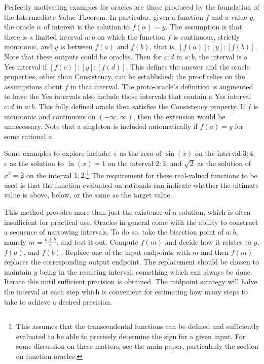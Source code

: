 \documentclass[12pt]{article}
\theoremstyle{remark}
\begin{document}
Perfectly motivating examples for oracles are those produced by the foundation of the Intermediate Value Theorem. In particular, given a function $f$ and a value $y$, the oracle $\alpha$ of interest is the solution to $f(\alpha) = y$. The assumption is that there is a limited interval $a:b$ on which the function $f$ is continuous, strictly monotonic, and $y$ is between $f(a)$ and $f(b)$, that is, $[f(a)] : [y] : [f(b)]$. Note that these outputs could be oracles. Then for $c:d$ in $a:b$, the interval is a Yes interval if $[f(c)]: [y] : [f(d)]$. This defines the answer and the oracle properties, other than Consistency, can be established; the proof relies on the assumptions about $f$ in that interval. The proto-oracle's definition is augmented to have the Yes intervals also include those intervals that contain a Yes interval $c:d$ in $a:b$. This fully defined oracle then satisfies the Consistency property. If $f$ is monotonic and continuous on $(-\infty, \infty)$, then the extension would be unnecessary. Note that a singleton is included automatically if $f(a) =y $ for some rational $a$.

Some examples to explore include: $\pi$ as the zero of $\sin(x)$ on the interval $3:4$, $e$ as the solution to  $\ln(x)=1$ on the interval $2:3$, and $\sqrt{2}$ as the solution of $x^2 = 2$ on the interval $1:2$.\footnote{This assumes that the transcendental functions can be defined and sufficiently evaluated to be able to precisely determine the sign for a given input. For some discussion on these matters, see the main paper, particularly the section on function oracles.} The requirement for these real-valued functions to be used is that the function evaluated on rationals can indicate whether the ultimate value is above, below, or the same as the target value. 

This method provides more than just the existence of a solution, which is often insufficient for practical use. Oracles in general come with the ability to construct a sequence of narrowing intervals. To do so, take the bisection point of $a:b$, namely $m =\frac{a+b}{2}$, and test it out. Compute $f(m)$ and decide how it relates to $y$, $f(a)$, and $f(b)$. Replace one of the input endpoints with $m$ and then $f(m)$ replaces the corresponding output endpoint. The replacement should be chosen to maintain $y$ being in the resulting interval, something which can always be done. Iterate this until sufficient precision is obtained.  The midpoint strategy will halve the interval at each step which is convenient for estimating how many steps to take to achieve a desired precision. 
\end{document}
